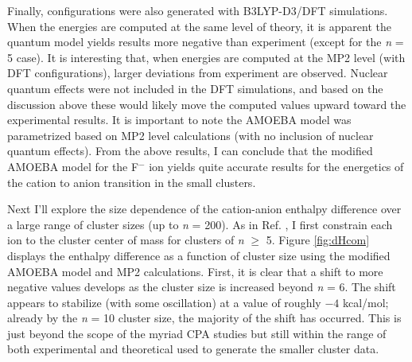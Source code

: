 \begin{cpa}
  Finally, configurations were also generated with B3LYP-D3/DFT simulations. When the energies are computed at the same level of theory, it is apparent the quantum
  model yields results more negative than experiment (except for the \emph{n} = 5 case). It is interesting that, when energies are computed at the MP2 level (with DFT
  configurations), larger deviations from experiment are observed. Nuclear quantum effects were not included in the DFT simulations, and based on the discussion 
  above these would likely move the computed values upward toward the experimental results. It is important to note the AMOEBA model was parametrized based on MP2 
  level calculations (with no inclusion of nuclear quantum effects)\cite{amoeba}. From the above results, I can conclude that the modified AMOEBA model
  for the F$^-$ ion yields quite accurate results for the energetics of the cation to anion transition in the small clusters. 

  Next I'll explore the size dependence of the cation-anion enthalpy difference over a large range of cluster sizes (up to \emph{n} = 200). As in Ref. \cite{pollard2014cpa1}, 
  I first constrain each ion to the cluster center of mass for clusters of \emph{n} $\geq$ 5. Figure \ref{fig:dHcom} displays the enthalpy difference as a function 
  of cluster size using the modified AMOEBA model and MP2 calculations. First, it is clear that a shift to more negative values develops as the cluster size is 
  increased beyond \emph{n} = 6. The shift appears to stabilize (with some oscillation) at a value of roughly $-4$ kcal/mol; already by the \emph{n} = 10 cluster size, 
  the majority of the shift has occurred. This is just beyond the scope of the myriad CPA studies\cite{coe1998cpa1,coe2001cpa2,coe2002cpa3,donald2010expand_cpa,kelly2006cpa}
  but still within the range of both experimental and theoretical used to generate the smaller cluster data\cite{wheeler2015hydration}.
  

\end{cpa}
